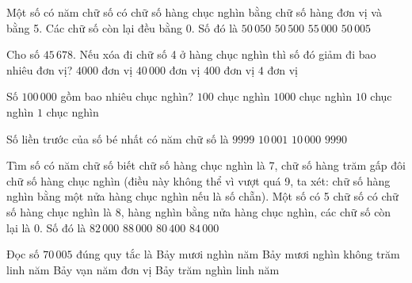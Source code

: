 \begin{ex} %
Một số có năm chữ số có chữ số hàng chục nghìn bằng chữ số hàng đơn vị và bằng 5. Các chữ số còn lại đều bằng 0. Số đó là
\choice
{$50\,050$}
{$50\,500$}
{$55\,000$}
{\True $50\,005$}
\end{ex}

\begin{ex} %
Cho số $45\,678$. Nếu xóa đi chữ số 4 ở hàng chục nghìn thì số đó giảm đi bao nhiêu đơn vị?
\choice
{$4000$ đơn vị}
{\True $40\,000$ đơn vị}
{$400$ đơn vị}
{$4$ đơn vị}
\end{ex}

\begin{ex} %
Số $100\,000$ gồm bao nhiêu chục nghìn?
\choice
{$100$ chục nghìn}
{$1000$ chục nghìn}
{\True $10$ chục nghìn}
{$1$ chục nghìn}
\end{ex}

\begin{ex} %
Số liền trước của số bé nhất có năm chữ số là
\choice
{\True $9999$}
{$10\,001$}
{$10\,000$}
{$9990$}
\end{ex}

\begin{ex} %
Tìm số có năm chữ số biết chữ số hàng chục nghìn là 7, chữ số hàng trăm gấp đôi chữ số hàng chục nghìn (điều này không thể vì vượt quá 9, ta xét: chữ số hàng nghìn bằng một nửa hàng chục nghìn nếu là số chẵn). Một số có 5 chữ số có chữ số hàng chục nghìn là 8, hàng nghìn bằng nửa hàng chục nghìn, các chữ số còn lại là 0. Số đó là
\choice
{$82\,000$}
{$88\,000$}
{$80\,400$}
{\True $84\,000$}
\end{ex}

\begin{ex} %
Đọc số $70\,005$ đúng quy tắc là
\choice
{Bảy mươi nghìn năm}
{\True Bảy mươi nghìn không trăm linh năm}
{Bảy vạn năm đơn vị}
{Bảy trăm nghìn linh năm}
\end{ex}

